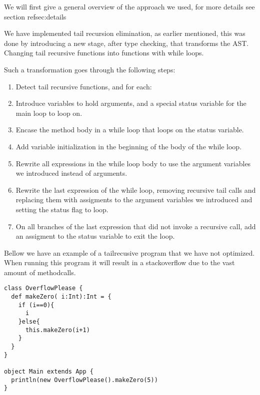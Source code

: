 \label{implementation}
We will first give a general overview of the approach we used, for more details see section ref{sec:details}

We have implemented tail recursion elimination, as earlier mentioned, this was done by introducing a new stage, after type checking, that transforms the AST. Changing tail recursive functions into functions with while loops.

Such a transformation goes through the following steps:

\begin{enumerate}
    \item Detect tail recursive functions, and for each:
    \item Introduce variables to hold arguments, and a special status variable for the main loop to loop on.
    \item Encase the method body in a while loop that loops on the status variable.
    \item Add variable initialization in the beginning of the body of the while loop.
    \item Rewrite all expressions in the while loop body to use the argument variables we introduced instead of arguments. 
    \item Rewrite the last expression of the while loop, removing recursive tail calls and replacing them with assigments to the argument variables we introduced and setting the status flag to loop.
    \item On all branches of the last expression that did not invoke a recursive call, add an assigment to the status variable to exit the loop.
\end{enumerate}

Bellow we have an example of a tailrecusive program that we have not optimized. When running this program it will result in a stackoverflow due to the vast amount of methodcalls.
\begin{lstlisting}
class OverflowPlease {
  def makeZero( i:Int):Int = {
    if (i==0){
      i
    }else{
      this.makeZero(i+1)
    }
  }
}

object Main extends App {
  println(new OverflowPlease().makeZero(5))
}
\end{lstlisting}

